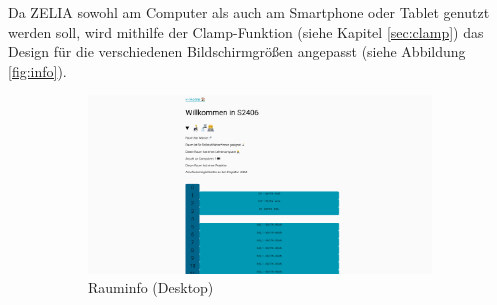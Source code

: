 
\clearpage
{}

Da ZELIA sowohl am Computer als auch am Smartphone oder Tablet genutzt werden soll, wird mithilfe der Clamp-Funktion (siehe Kapitel \ref{sec:clamp}) das Design für die verschiedenen Bildschirmgrößen angepasst (siehe Abbildung \ref{fig:info}).


\begin{figure}[H]
    \begin{subfigure}[c]{0.65\textwidth}
        \centering
        \includegraphics[width=\textwidth]{media/ResponsiveDesign/ZeliaDesktop.png}
        \caption{Rauminfo (Desktop)}
    \end{subfigure} \hfill
    \begin{subfigure}[c]{0.35\textwidth}
        \centering

\end{subfigure}
\end{figure}
